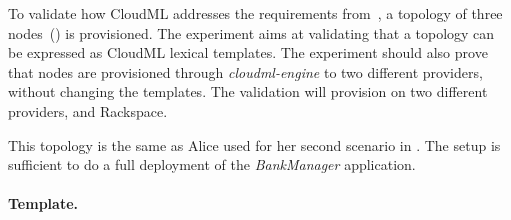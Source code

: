 
To validate how CloudML addresses the requirements from~,
a topology of three nodes~() is provisioned.
The experiment aims at validating that a topology can be expressed as CloudML lexical templates.
The experiment should also prove that nodes are provisioned through \emph{cloudml-engine}
to two different providers, without changing the templates.
The validation will provision on two different providers,  and Rackspace.

This topology is the same as Alice used for her second scenario in .
The setup is sufficient to do a full deployment of the \emph{BankManager} application.

\paragraph{Template.}



